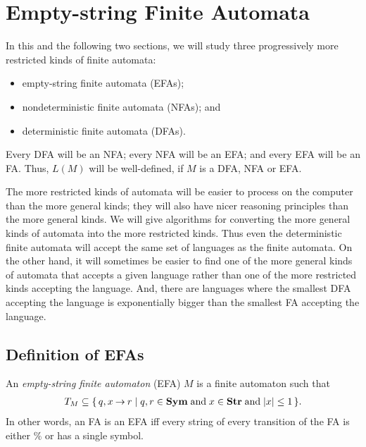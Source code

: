 \section{Empty-string Finite Automata}
\label{EmptyStringFiniteAutomata}

%
%
%

In this and the following two sections, we will study three
progressively more restricted kinds of finite automata:
\begin{itemize}
\item empty-string finite automata (EFAs);

\item nondeterministic finite automata (NFAs); and

\item deterministic finite automata (DFAs).
\end{itemize}
Every DFA will be an NFA; every NFA will be an EFA; and every EFA will
be an FA.  Thus, $L(M)$ will be well-defined, if $M$ is a DFA, NFA or
EFA.

The more restricted kinds of automata will be easier to process on the
computer than the more general kinds; they will also have nicer
reasoning principles than the more general kinds.  We will give
algorithms for converting the more general kinds of automata into the
more restricted kinds.  Thus even the deterministic finite automata
will accept the same set of languages as the finite automata.  On the
other hand, it will sometimes be easier to find one of the more
general kinds of automata that accepts a given language rather than
one of the more restricted kinds accepting the language.  And, there
are languages where the smallest DFA accepting the language is
exponentially bigger than the smallest FA accepting the language.

\subsection{Definition of EFAs}

An \emph{empty-string finite automaton} (EFA) $M$ is
a finite automaton such that
\begin{gather*}
T_M\subseteq\{ \, q, x\mathbin{\to} r \mid q,r\in\mathbf{Sym}\;\allowbreak\mbox{and}\allowbreak\;x\in\mathbf{Str}\;\allowbreak\mbox{and}\allowbreak\;|x|\leq 1 \, \}.
\end{gather*}
In other words, an FA is an EFA iff every string of every transition
of the FA is either $\%$ or has a single symbol.

